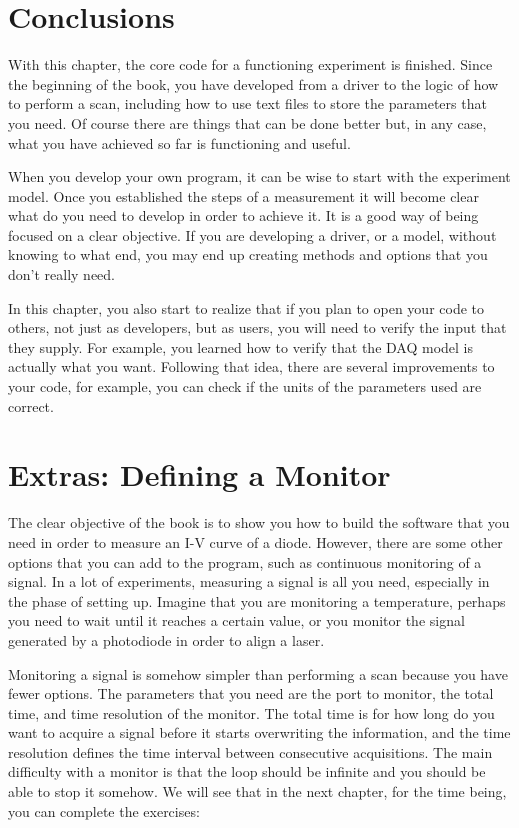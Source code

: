 {

\section{Conclusions}\label{conclusions}
With this chapter, the core code for a functioning experiment is
finished. Since the beginning of the book, you have developed from a
driver to the logic of how to perform a scan, including how to use text
files to store the parameters that you need. Of course there are things
that can be done better but, in any case, what you have achieved so far
is functioning and useful.

When you develop your own program, it can be wise to start with the
experiment model. Once you established the steps of a measurement it
will become clear what do you need to develop in order to achieve it. It
is a good way of being focused on a clear objective. If you are
developing a driver, or a model, without knowing to what end, you may
end up creating methods and options that you don't really need.

In this chapter, you also start to realize that if you plan to open your
code to others, not just as developers, but as users, you will need to
verify the input that they supply. For example, you learned how to
verify that the {DAQ} model is actually what you want. Following that
idea, there are several improvements to your code, for example, you can
check if the units of the parameters used are correct.

\section{Extras: Defining a Monitor}\label{extras-defining-amonitor}
The clear objective of the book is to show you how to build the software
that you need in order to measure an I-V curve of a diode. However,
there are some other options that you can add to the program, such as
continuous monitoring of a signal. In a lot of experiments, measuring a
signal is all you need, especially in the phase of setting up. Imagine
that you are monitoring a temperature, perhaps you need to wait until it
reaches a certain value, or you monitor the signal generated by a
photodiode in order to align a laser.

Monitoring a signal is somehow simpler than performing a scan because
you have fewer options. The parameters that you need are the port to
monitor, the total time, and time resolution of the monitor. The total
time is for how long do you want to acquire a signal before it starts
overwriting the information, and the time resolution defines the time
interval between consecutive acquisitions. The main difficulty with a
monitor is that the loop should be infinite and you should be able to
stop it somehow. We will see that in the next chapter, for the time
being, you can complete the exercises:

}
